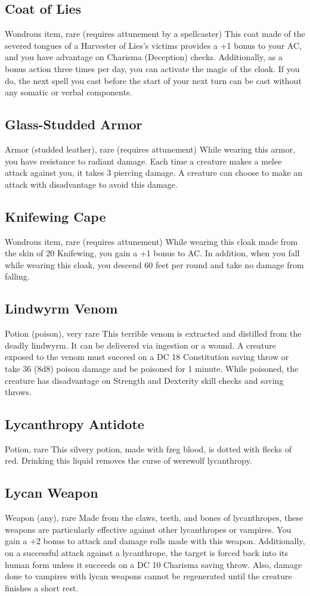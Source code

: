 \documentclass[10pt,a4paper,twoside,twocolumn,openany,bg=print,nodeprecatedcode]{dndbook}
\begin{document}
\subsection{Coat of Lies}
Wondrous item, rare (requires attunement by a spellcaster)
This coat made of the severed tongues of a Harvester of Lies's victims provides a +1 bonus to your AC, and you have advantage on Charisma (Deception) checks.
Additionally, as a bonus action three times per day, you can activate the magic of the cloak. If you do, the next spell you cast before the start of your next turn can be cast without any somatic or verbal components.
\subsection{Glass-Studded Armor}
Armor (studded leather), rare (requires attunement)
While wearing this armor, you have resistance to radiant damage. Each time a creature makes a melee attack against you, it takes 3 piercing damage. A creature can choose to make an attack with disadvantage to avoid this damage.
\subsection{Knifewing Cape}
Wondrous item, rare (requires attunement)
While wearing this cloak made from the skin of 20 Knifewing, you gain a +1 bonus to AC. In addition, when you fall while wearing this cloak, you descend 60 feet per round and take no damage from falling.
\subsection{Lindwyrm Venom}
Potion (poison), very rare
This terrible venom is extracted and distilled from the deadly lindwyrm. It can be delivered via ingestion or a wound. A creature exposed to the venom must succeed on a DC 18 Constitution saving throw or take 36 (8d8) poison damage and be poisoned for 1 minute. While poisoned, the creature has disadvantage on Strength and Dexterity skill checks and saving throws.
\subsection{Lycanthropy Antidote}
Potion, rare
This silvery potion, made with fzeg blood, is dotted with flecks of red. Drinking this liquid removes the curse of werewolf lycanthropy.
\subsection{Lycan Weapon}
Weapon (any), rare
Made from the claws, teeth, and bones of lycanthropes, these weapons are particularly effective against other lycanthropes or vampires. You gain a +2 bonus to attack and damage rolls made with this weapon.
Additionally, on a successful attack against a lycanthrope, the target is forced back into its human form unless it succeeds on a DC 10 Charisma saving throw. Also, damage done to vampires with lycan weapons cannot be regenerated until the creature finishes a short rest.
\end{document}
